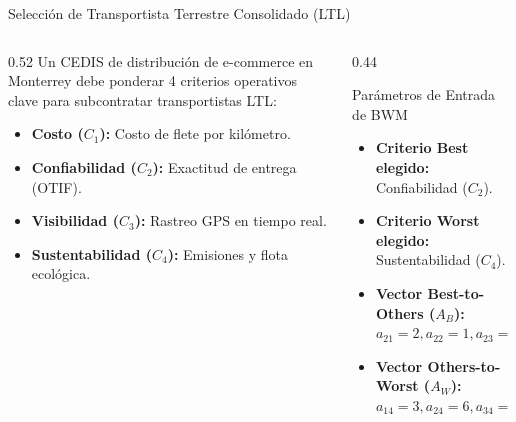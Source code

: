\documentclass[aspectratio=169, 10pt]{beamer}
\begin{document}
\begin{frame}{Selección de Transportista Terrestre Consolidado (LTL)}
    \begin{columns}[T]
        \begin{column}{0.52\textwidth}
            \small
            Un CEDIS de distribución de e-commerce en Monterrey debe ponderar 4 criterios operativos clave para subcontratar transportistas LTL:
            \begin{itemize}
                \footnotesize
                \item \textbf{Costo ($C_1$):} Costo de flete por kilómetro.
                \item \textbf{Confiabilidad ($C_2$):} Exactitud de entrega (OTIF).
                \item \textbf{Visibilidad ($C_3$):} Rastreo GPS en tiempo real.
                \item \textbf{Sustentabilidad ($C_4$):} Emisiones y flota ecológica.
            \end{itemize}
        \end{column}
        
        \begin{column}{0.44\textwidth}
            \begin{exampleblock}{Parámetros de Entrada de BWM}
                \scriptsize
                \begin{itemize}
                    \item \textbf{Criterio Best elegido:} Confiabilidad ($C_2$).
                    \item \textbf{Criterio Worst elegido:} Sustentabilidad ($C_4$).
                    \item \textbf{Vector Best-to-Others ($A_B$):}
                          $a_{21}=2, a_{22}=1, a_{23}=3, a_{24}=6$
                    \item \textbf{Vector Others-to-Worst ($A_W$):}
                          $a_{14}=3, a_{24}=6, a_{34}=2, a_{44}=1$
                \end{itemize}
            \end{exampleblock}
        \end{column}
    \end{columns}
\end{frame}
\end{document}
